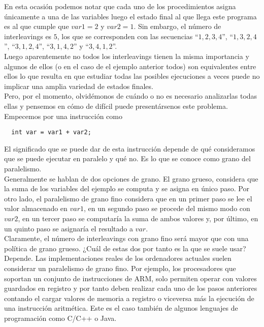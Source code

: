En esta ocasión podemos notar que cada uno de los procedimientos asigna únicamente a una de las variables luego el estado final al que llega este programa es al que cumple que $var1 = 2$ y $var2 = 1$. Sin embargo, el número de interleavings es $5$, los que se corresponden con las secuencias ``$1, 2, 3, 4$'', ``$1, 3, 2, 4$'', ``$3, 1, 2, 4$'', ``$3, 1, 4, 2$'' y ``$3, 4, 1, 2$''.\\

Luego aparentemente no todos los interleavings tienen la misma importancia y algunos de ellos (o en el caso de el ejemplo anterior todos) son equivalentes entre ellos lo que resulta en que estudiar todas las posibles ejecuciones a veces puede no implicar una amplia variedad de estados finales.\\

Pero, por el momento, olvidémonos de cuándo o no es necesario analizarlas todas ellas y pensemos en cómo de difícil puede presentársenos este problema.\\

Empecemos por una instrucción como
\begin{lstlisting}
  int var = var1 + var2;
\end{lstlisting}
El significado que se puede dar de esta instrucción depende de qué consideramos que se puede ejecutar en paralelo y qué no. Es lo que se conoce como grano del paralelismo.\\

Generalmente se hablan de dos opciones de grano. El grano grueso, considera que la suma de los variables del ejemplo se computa y se asigna en único paso. Por otro lado, el paralelismo de grano fino considera que en un primer paso se lee el valor almacenado en $var1$, en un segundo paso se procede del mismo modo con $var2$, en un tercer paso se computaría la suma de ambos valores y, por último, en un quinto paso se asignaría el resultado a $var$.\\

Claramente, el número de interleavings con grano fino será mayor que con una política de grano grueso. ¿Cuál de estas dos por tanto es la que se suele usar? Depende. Las implementaciones reales de los ordenadores actuales suelen considerar un paralelismo de grano fino. Por ejemplo, los procesadores que soportan un conjunto de instrucciones de ARM, solo permiten operar con valores guardados en registro y por tanto deben realizar cada uno de los pasos anteriores contando el cargar valores de memoria a registro o viceversa más la ejecución de una instrucción aritmética. Este es el caso también de algunos lenguajes de programación como C/C++ o Java.\\

